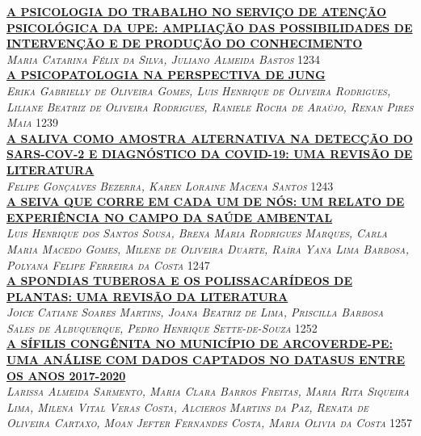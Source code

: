 \noindent \textsc{\hyperlink{trabalhos/248956.pdf.1}{\textbf{A PSICOLOGIA DO TRABALHO NO SERVIÇO DE ATENÇÃO PSICOLÓGICA DA UPE: AMPLIAÇÃO DAS POSSIBILIDADES DE INTERVENÇÃO E DE PRODUÇÃO DO CONHECIMENTO}}}\\ 
\noindent \textsc{\textit{Maria Catarina Félix da Silva, Juliano Almeida Bastos}} \hfill 1234\\ 

\noindent \textsc{\hyperlink{trabalhos/251405.pdf.1}{\textbf{A PSICOPATOLOGIA NA PERSPECTIVA DE JUNG}}}\\ 
\noindent \textsc{\textit{Erika Gabrielly de Oliveira Gomes, Luis Henrique de Oliveira Rodrigues, Liliane Beatriz de Oliveira Rodrigues, Raniele Rocha de Araújo, Renan Pires Maia}} \hfill 1239\\ 

\noindent \textsc{\hyperlink{trabalhos/250701.pdf.1}{\textbf{A SALIVA COMO AMOSTRA ALTERNATIVA NA DETECÇÃO DO SARS-COV-2 E DIAGNÓSTICO DA COVID-19: UMA REVISÃO DE LITERATURA}}}\\ 
\noindent \textsc{\textit{Felipe Gonçalves Bezerra, Karen Loraine Macena Santos}} \hfill 1243\\ 

\noindent \textsc{\hyperlink{trabalhos/250149.pdf.1}{\textbf{A SEIVA QUE CORRE EM CADA UM DE NÓS: UM RELATO DE EXPERIÊNCIA NO CAMPO DA SAÚDE AMBENTAL}}}\\ 
\noindent \textsc{\textit{Luis Henrique dos Santos Sousa, Brena Maria Rodrigues Marques, Carla Maria Macedo Gomes, Milene de Oliveira Duarte, Raíra Yana Lima Barbosa, Polyana Felipe Ferreira da Costa}} \hfill 1247\\ 

\noindent \textsc{\hyperlink{trabalhos/250548.pdf.1}{\textbf{A SPONDIAS TUBEROSA E OS POLISSACARÍDEOS DE PLANTAS: UMA REVISÃO DA LITERATURA}}}\\ 
\noindent \textsc{\textit{Joice Catiane Soares Martins, Joana Beatriz de Lima, Priscilla Barbosa Sales de Albuquerque, Pedro Henrique Sette-de-Souza}} \hfill 1252\\ 

\noindent \textsc{\hyperlink{trabalhos/250121.pdf.1}{\textbf{A SÍFILIS CONGÊNITA NO MUNICÍPIO DE ARCOVERDE-PE: UMA ANÁLISE COM DADOS CAPTADOS NO DATASUS ENTRE OS ANOS 2017-2020}}}\\ 
\noindent \textsc{\textit{Larissa Almeida Sarmento, Maria Clara Barros Freitas, Maria Rita Siqueira Lima, Milena Vital Veras Costa, Alcieros Martins da Paz, Renata de Oliveira Cartaxo, Moan Jefter Fernandes Costa, Maria Olivia da Costa}} \hfill 1257\\ 

